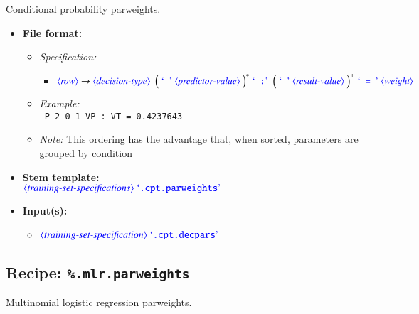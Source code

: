 \documentclass[12pt]{report}
\def\blue{\color{blue}}
\def\magenta{\color{magenta}}
\begin{document}
Conditional probability parweights.

\begin{itemize}
      \item \textbf{File format:}
      \begin{itemize}
            \item \textit{Specification:}
            \begin{itemize}
                  \item {\small $\dtype{row} \rightarrow \dtype{decision-type} \ \ \smash{\Big( \ \dcode{\ } \ \dtype{predictor-value} \ \Big)^*} \ \dcode{ :} \ \ \smash{\Big( \ \dcode{\ } \ \dtype{result-value} \ \Big)^+} \ \dcode{ = } \ \dtype{weight}$}
            \end{itemize}
            \item \textit{Example:}\\
            {\magenta\tt
            P 2 0 1 VP : VT = 0.4237643
            }
            \item \textit{Note:} This ordering has the advantage that, when sorted, parameters are grouped by condition
      \end{itemize}
      \item \textbf{Stem template:}\\
      $\dtype{training-set-specifications}  \ \dcode{.cpt.parweights}$
      \item \textbf{Input(s):}
      \begin{itemize}
            \item $\dtype{training-set-specification} \ \dcode{.cpt.decpars}$
      \end{itemize}
\end{itemize}

\subsection{Recipe: \blue\tt \%.mlr.parweights}

Multinomial logistic regression parweights.
\end{document}
